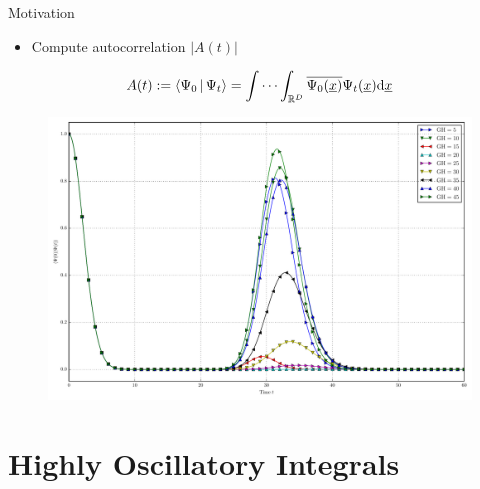 \documentclass{beamer}
\begin{document}
\begin{frame}{Motivation}
  \begin{itemize}
    \item Compute autocorrelation $|A(t)|$
  \end{itemize}
  \vspace{0.2cm}
  \begin{equation*}
    A(t) := \Braket{\Psi_0 | \Psi_t}
         = \idotsint_{\mathbb{R}^D} \overline{\Psi_0(\underline{x})} \Psi_t(\underline{x}) \mathrm{d}\underline{x}
  \end{equation*}
  \begin{figure}
    \centering
    \includegraphics[width=0.7\linewidth]{./fig/ac_mercurial_morse.pdf}
  \end{figure}
\end{frame}


\section{Highly Oscillatory Integrals}
\end{document}
